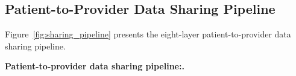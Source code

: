\label{sec:research_methodology_approach}
\label{tab:research_approach}

\subsection{Patient-to-Provider Data Sharing Pipeline}
\label{sec:sharing_pipeline}

Figure~\ref{fig:sharing_pipeline} presents the eight-layer patient-to-provider data sharing pipeline.

\noindent\textbf{Patient-to-provider data sharing pipeline:.}

